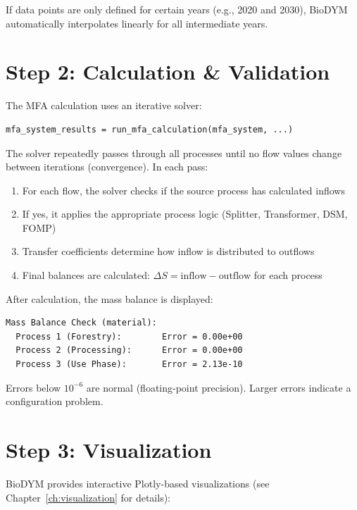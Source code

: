 \begin{notebox}
If data points are only defined for certain years (e.g., 2020 and 2030), BioDYM automatically interpolates linearly for all intermediate years.
\end{notebox}

\section{Step 2: Calculation \& Validation}

The MFA calculation uses an iterative solver:

\begin{lstlisting}[style=python]
mfa_system_results = run_mfa_calculation(mfa_system, ...)
\end{lstlisting}

The solver repeatedly passes through all processes until no flow values change between iterations (convergence). In each pass:
\begin{enumerate}
  \item For each flow, the solver checks if the source process has calculated inflows
  \item If yes, it applies the appropriate process logic (Splitter, Transformer, DSM, FOMP)
  \item Transfer coefficients determine how inflow is distributed to outflows
  \item Final balances are calculated: $\Delta S = \text{inflow} - \text{outflow}$ for each process
\end{enumerate}

After calculation, the mass balance is displayed:

\begin{lstlisting}
Mass Balance Check (material):
  Process 1 (Forestry):        Error = 0.00e+00
  Process 2 (Processing):      Error = 0.00e+00
  Process 3 (Use Phase):       Error = 2.13e-10
\end{lstlisting}

Errors below $10^{-6}$ are normal (floating-point precision). Larger errors indicate a configuration problem.

\section{Step 3: Visualization}

BioDYM provides interactive Plotly-based visualizations (see Chapter~\ref{ch:visualization} for details):

